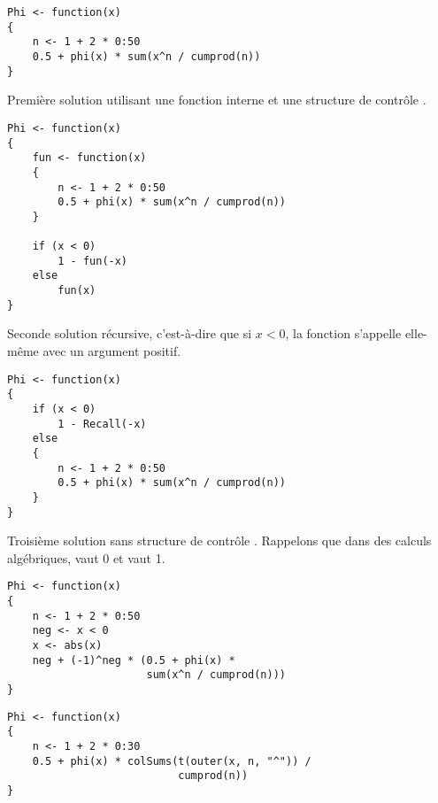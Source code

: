 \begin{reponse}{5.4}
\begin{verbatim}
Phi <- function(x)
{
    n <- 1 + 2 * 0:50
    0.5 + phi(x) * sum(x^n / cumprod(n))
}
\end{verbatim}
  
\end{reponse}
\begin{reponse}{5.5}
    Premi^^e8re solution utilisant une fonction interne et une structure
    de contr^^f4le .
\begin{verbatim}
Phi <- function(x)
{
    fun <- function(x)
    {
        n <- 1 + 2 * 0:50
        0.5 + phi(x) * sum(x^n / cumprod(n))
    }

    if (x < 0)
        1 - fun(-x)
    else
        fun(x)
}
\end{verbatim}
    Seconde solution r^^e9cursive, c'est-^^e0-dire que si $x < 0$, la
    fonction s'appelle elle-m^^eame avec un argument positif.
\begin{verbatim}
Phi <- function(x)
{
    if (x < 0)
        1 - Recall(-x)
    else
    {
        n <- 1 + 2 * 0:50
        0.5 + phi(x) * sum(x^n / cumprod(n))
    }
}
\end{verbatim}
    Troisi^^e8me solution sans structure de contr^^f4le . Rappelons que dans des calculs alg^^e9briques,
     vaut 0 et  vaut 1.
\begin{verbatim}
Phi <- function(x)
{
    n <- 1 + 2 * 0:50
    neg <- x < 0
    x <- abs(x)
    neg + (-1)^neg * (0.5 + phi(x) *
                      sum(x^n / cumprod(n)))
}
\end{verbatim}
  
\end{reponse}
\begin{reponse}{5.6}
\begin{verbatim}
Phi <- function(x)
{
    n <- 1 + 2 * 0:30
    0.5 + phi(x) * colSums(t(outer(x, n, "^")) /
                           cumprod(n))
}
\end{verbatim}
  
\end{reponse}
